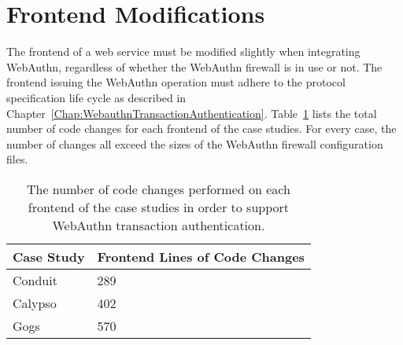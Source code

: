 







\section{Frontend Modifications}\label{Sec:FrontendModifications}

The frontend of a web service must be modified slightly when integrating WebAuthn, regardless of whether the WebAuthn firewall is in use or not. The frontend issuing the WebAuthn operation must adhere to the protocol specification life cycle as described in Chapter~\ref{Chap:WebauthnTransactionAuthentication}. Table~\ref{Table:EvaluationsFrontendModifications} lists the total number of code changes for each frontend of the case studies. For every case, the number of changes all exceed the sizes of the WebAuthn firewall configuration files.

\begin{table}[h]
\centering

\begin{tabular}{ m{4.5cm} m{6cm}  } 
 \hline
 Case Study & Frontend Lines of Code Changes \\ 
 \hline \hline

 Conduit & 289 \\ \hline

 Calypso & 402 \\ \hline

 Gogs & 570 \\ \hline

\end{tabular}
\caption{The number of code changes performed on each frontend of the case studies in order to support WebAuthn transaction authentication.}
\label{Table:EvaluationsFrontendModifications}
\end{table}

